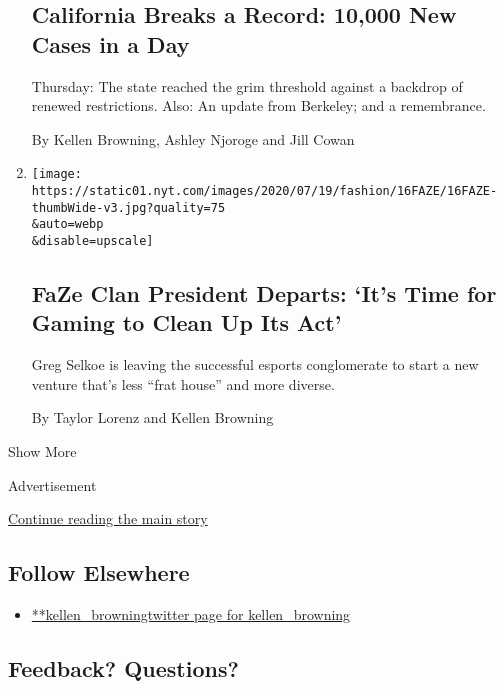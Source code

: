 \begin{enumerate}
  \hypertarget{california-breaks-a-record-10000-new-cases-in-a-day}{%
  \subsection{California Breaks a Record: 10,000 New Cases in a
  Day}\label{california-breaks-a-record-10000-new-cases-in-a-day}}

  Thursday: The state reached the grim threshold against a backdrop of
  renewed restrictions. Also: An update from Berkeley; and a
  remembrance.

  By Kellen Browning, Ashley Njoroge and Jill Cowan
\item
  \href{/2020/07/16/style/xset-gaming-lifestyle-company-faze-clan.html}{}

  \texttt{[image: https://static01.nyt.com/images/2020/07/19/fashion/16FAZE/16FAZE-thumbWide-v3.jpg?quality=75\\\&auto=webp\\\&disable=upscale]}

  \hypertarget{faze-clan-president-departs-its-time-for-gaming-to-clean-up-its-act}{%
  \subsection{FaZe Clan President Departs: `It's Time for Gaming to
  Clean Up Its
  Act'}\label{faze-clan-president-departs-its-time-for-gaming-to-clean-up-its-act}}

  Greg Selkoe is leaving the successful esports conglomerate to start a
  new venture that's less ``frat house'' and more diverse.

  By Taylor Lorenz and Kellen Browning
\end{enumerate}

Show More

Advertisement

\protect\hyperlink{after-mid2}{Continue reading the main story}

\hypertarget{follow-elsewhere}{%
\subsection{Follow Elsewhere}\label{follow-elsewhere}}

\begin{itemize}
\tightlist
\item
  \href{https://twitter.com/kellen_browning}{**kellen\_browningtwitter
  page for kellen\_browning}
\end{itemize}

\hypertarget{feedback-questions}{%
\subsection{Feedback? Questions?}\label{feedback-questions}}

